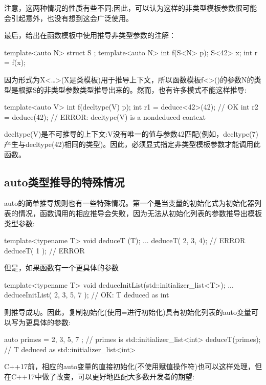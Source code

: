 注意，这两种情况的性质有些不同;因此，可以认为这样的非类型模板参数很可能会引起意外，也没有想到这会广泛使用。

最后，给出在函数模板中使用推导非类型参数的注解：

\begin{cpp}
template<auto N> struct S {};
template<auto N> int f(S<N> p);
S<42> x;
int r = f(x);
\end{cpp}

因为形式为X<…>(X是类模板)用于推导上下文，所以函数模板f<>()的参数N的类型是根据S的非类型参数类型推导出来的。然而，也有许多模式不能这样推导:

\begin{cpp}
template<auto V> int f(decltype(V) p);
int r1 = deduce<42>(42); // OK
int r2 = deduce(42); // ERROR: decltype(V) is a nondeduced context
\end{cpp}

decltype(V)是不可推导的上下文:V没有唯一的值与参数42匹配(例如，decltype(7)产生与decltype(42)相同的类型)。因此，必须显式指定非类型模板参数才能调用此函数。

\subsection{auto类型推导的特殊情况}

auto的简单推导规则也有一些特殊情况。第一个是当变量的初始化式为初始化器列表的情况，函数调用的相应推导会失败，因为无法从初始化列表的参数推导出模板类型参数:

\begin{cpp}
template<typename T>
void deduceT (T);
...
deduceT({ 2, 3, 4}); // ERROR
deduceT({ 1 }); // ERROR
\end{cpp}

但是，如果函数有一个更具体的参数

\begin{cpp}
template<typename T>
void deduceInitList(std::initializer_list<T>);
...
deduceInitList({ 2, 3, 5, 7 }); // OK: T deduced as int
\end{cpp}

则推导成功。因此，复制初始化(使用=进行初始化)具有初始化列表的auto变量可以写为更具体的参数:

\begin{cpp}
auto primes = { 2, 3, 5, 7 }; // primes is std::initializer_list<int>
deduceT(primes); // T deduced as std::initializer_list<int>
\end{cpp}

C++17前，相应的auto变量的直接初始化(不使用赋值操作符)也可以这样处理，但在C++17中做了改变，可以更好地匹配大多数开发者的期望:

